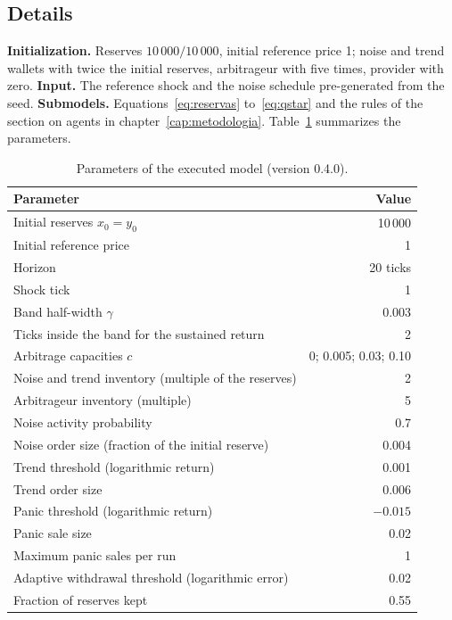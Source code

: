 \subsection*{Details}

\textbf{Initialization.} Reserves $10\,000/10\,000$, initial reference price 1; noise and trend wallets with twice the initial reserves, arbitrageur with five times, provider with zero. \textbf{Input.} The reference shock and the noise schedule pre-generated from the seed. \textbf{Submodels.} Equations~\eqref{eq:reservas} to~\eqref{eq:qstar} and the rules of the section on agents in chapter~\ref{cap:metodologia}. Table~\ref{tab:parametros} summarizes the parameters.

\begin{table}[htbp]
\centering
\caption{Parameters of the executed model (version 0.4.0).}
\label{tab:parametros}
\small
\begin{tabular}{@{}lr@{}}
\toprule
Parameter & Value \\
\midrule
Initial reserves $x_0=y_0$ & 10\,000 \\
Initial reference price & 1 \\
Horizon & 20 ticks \\
Shock tick & 1 \\
Band half-width $\gamma$ & 0.003 \\
Ticks inside the band for the sustained return & 2 \\
Arbitrage capacities $c$ & 0; 0.005; 0.03; 0.10 \\
Noise and trend inventory (multiple of the reserves) & 2 \\
Arbitrageur inventory (multiple) & 5 \\
Noise activity probability & 0.7 \\
Noise order size (fraction of the initial reserve) & 0.004 \\
Trend threshold (logarithmic return) & 0.001 \\
Trend order size & 0.006 \\
Panic threshold (logarithmic return) & $-0.015$ \\
Panic sale size & 0.02 \\
Maximum panic sales per run & 1 \\
Adaptive withdrawal threshold (logarithmic error) & 0.02 \\
Fraction of reserves kept & 0.55 \\
\bottomrule
\end{tabular}
\end{table}

